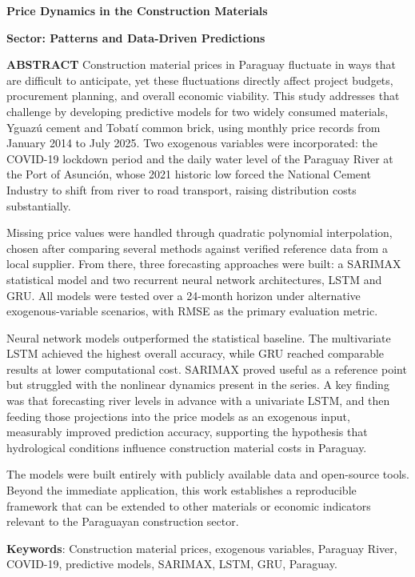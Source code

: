 \centerline{\textbf{\large Price Dynamics in the Construction Materials}}
\centerline{\textbf{\large Sector: Patterns and Data-Driven Predictions }}
\vspace{2cm}

\vspace{0.5cm}

\vspace{0.5cm}

\noindent
\textbf{ABSTRACT}
\justify
Construction material prices in Paraguay fluctuate in ways that are difficult to anticipate, yet these fluctuations directly affect project budgets, procurement planning, and overall economic viability. This study addresses that challenge by developing predictive models for two widely consumed materials, Yguazú cement and Tobatí common brick, using monthly price records from January 2014 to July 2025. Two exogenous variables were incorporated: the COVID-19 lockdown period and the daily water level of the Paraguay River at the Port of Asunción, whose 2021 historic low forced the National Cement Industry to shift from river to road transport, raising distribution costs substantially.

\justify
Missing price values were handled through quadratic polynomial interpolation, chosen after comparing several methods against verified reference data from a local supplier. From there, three forecasting approaches were built: a SARIMAX statistical model and two recurrent neural network architectures, LSTM and GRU. All models were tested over a 24-month horizon under alternative exogenous-variable scenarios, with RMSE as the primary evaluation metric.

\justify
Neural network models outperformed the statistical baseline. The multivariate LSTM achieved the highest overall accuracy, while GRU reached comparable results at lower computational cost. SARIMAX proved useful as a reference point but struggled with the nonlinear dynamics present in the series. A key finding was that forecasting river levels in advance with a univariate LSTM, and then feeding those projections into the price models as an exogenous input, measurably improved prediction accuracy, supporting the hypothesis that hydrological conditions influence construction material costs in Paraguay.

\justify
The models were built entirely with publicly available data and open-source tools. Beyond the immediate application, this work establishes a reproducible framework that can be extended to other materials or economic indicators relevant to the Paraguayan construction sector.

\vspace{0.5cm}

\noindent
\textbf{Keywords}: Construction material prices, exogenous variables, Paraguay River, COVID-19, predictive models, SARIMAX, LSTM, GRU, Paraguay.

